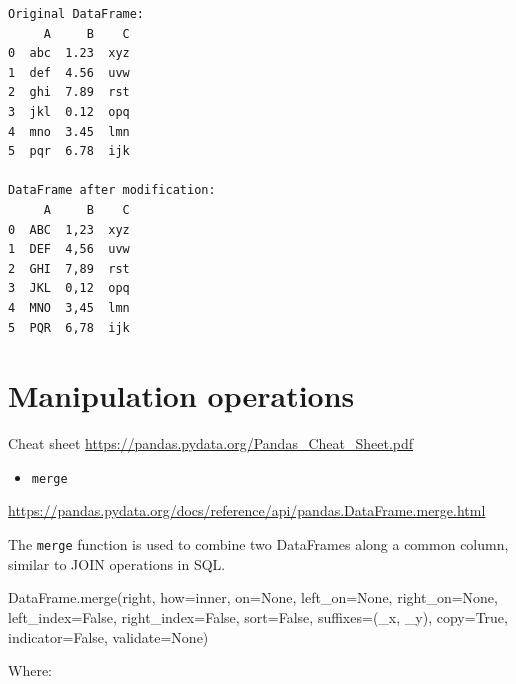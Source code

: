 \documentclass[
  english,
  letterpaper,
  DIV=11,
  numbers=noendperiod]{scrreprt}
\newenvironment{Shaded}{\begin{snugshade}}{\end{snugshade}}
\newcommand{\NormalTok}[1]{\textcolor[rgb]{0.00,0.23,0.31}{#1}}
\newcommand{\OperatorTok}[1]{\textcolor[rgb]{0.37,0.37,0.37}{#1}}
\newcommand{\StringTok}[1]{\textcolor[rgb]{0.13,0.47,0.30}{#1}}
\newcommand{\VariableTok}[1]{\textcolor[rgb]{0.07,0.07,0.07}{#1}}
\providecommand{\tightlist}{%
  \setlength{\itemsep}{0pt}\setlength{\parskip}{0pt}}
\begin{document}
\begin{verbatim}
Original DataFrame:
     A     B    C
0  abc  1.23  xyz
1  def  4.56  uvw
2  ghi  7.89  rst
3  jkl  0.12  opq
4  mno  3.45  lmn
5  pqr  6.78  ijk

DataFrame after modification:
     A     B    C
0  ABC  1,23  xyz
1  DEF  4,56  uvw
2  GHI  7,89  rst
3  JKL  0,12  opq
4  MNO  3,45  lmn
5  PQR  6,78  ijk
\end{verbatim}

\section{Manipulation operations}\label{manipulation-operations}

Cheat sheet \url{https://pandas.pydata.org/Pandas_Cheat_Sheet.pdf}

\begin{itemize}
\tightlist
\item
  \texttt{merge}
\end{itemize}

\url{https://pandas.pydata.org/docs/reference/api/pandas.DataFrame.merge.html}

The \texttt{merge} function is used to combine two DataFrames along a
common column, similar to JOIN operations in SQL.

\begin{Shaded}
\begin{Highlighting}[]
\NormalTok{DataFrame.merge(right, how}\OperatorTok{=}\StringTok{\textquotesingle{}inner\textquotesingle{}}\NormalTok{, on}\OperatorTok{=}\VariableTok{None}\NormalTok{, left\_on}\OperatorTok{=}\VariableTok{None}\NormalTok{, right\_on}\OperatorTok{=}\VariableTok{None}\NormalTok{,}
\NormalTok{                left\_index}\OperatorTok{=}\VariableTok{False}\NormalTok{, right\_index}\OperatorTok{=}\VariableTok{False}\NormalTok{, sort}\OperatorTok{=}\VariableTok{False}\NormalTok{,}
\NormalTok{                suffixes}\OperatorTok{=}\NormalTok{(}\StringTok{\textquotesingle{}\_x\textquotesingle{}}\NormalTok{, }\StringTok{\textquotesingle{}\_y\textquotesingle{}}\NormalTok{), copy}\OperatorTok{=}\VariableTok{True}\NormalTok{, indicator}\OperatorTok{=}\VariableTok{False}\NormalTok{, validate}\OperatorTok{=}\VariableTok{None}\NormalTok{)}
\end{Highlighting}
\end{Shaded}

Where:
\end{document}
